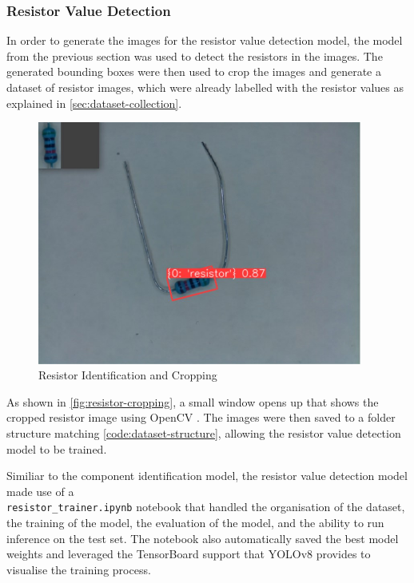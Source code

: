 \subsubsection{Resistor Value Detection}
\label{sec:resistor-value-detection}
In order to generate the images for the resistor value detection model, the model from the previous section was used to detect the resistors in the images. The generated bounding boxes were then used to crop the images and generate a dataset of resistor images, which were already labelled with the resistor values as explained in \autoref{sec:dataset-collection}.

\begin{figure}[H]
  \hfill
  \begin{minipage}[t]{\textwidth}
    \centering
    \includegraphics[height=8cm]{imgs/cv/2024-06-10_21-45-23_python.jpg}
    \caption{Resistor Identification and Cropping}
    \label{fig:resistor-cropping}
  \end{minipage}
\end{figure}

As shown in \autoref{fig:resistor-cropping}, a small window opens up that shows the cropped resistor image using OpenCV \cite{home_2024}. The images were then saved to a folder structure matching \autoref{code:dataset-structure}, allowing the resistor value detection model to be trained.

Similiar to the component identification model, the resistor value detection model made use of a 
\\ \texttt{resistor\_trainer.ipynb} notebook that handled the organisation of the dataset, the training of the model, the evaluation of the model, and the ability to run inference on the test set. The notebook also automatically saved the best model weights and leveraged the TensorBoard support that YOLOv8 provides to visualise the training process.

